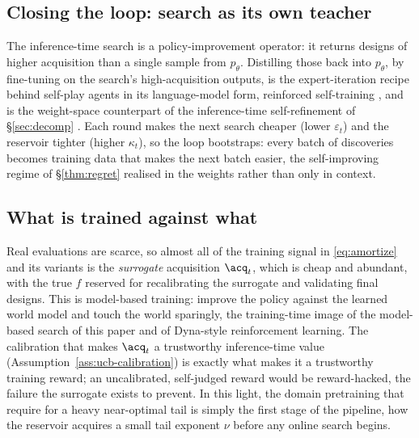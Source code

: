 \subsection{Closing the loop: search as its own teacher}
\label{sec:selfdistill}
The inference-time search is a policy-improvement operator: it returns designs of higher acquisition than a
single sample from $p_\theta$. Distilling those back into $p_\theta$, by fine-tuning on the search's
high-acquisition outputs, is the expert-iteration recipe behind self-play agents \citep{silver2017mastering} in
its language-model form, reinforced self-training \citep{gulcehre2023reinforced}, and is the weight-space
counterpart of the inference-time self-refinement of \S\ref{sec:decomp}
\citep{madaan2023selfrefine,shinn2023reflexion}. Each round makes the next search cheaper (lower
$\varepsilon_t$) and the reservoir tighter (higher $\kappa_t$), so the loop bootstraps: every batch of
discoveries becomes training data that makes the next batch easier, the self-improving regime of
\S\ref{thm:regret} realised in the weights rather than only in context.

\subsection{What is trained against what}
\label{sec:trainecon}
Real evaluations are scarce, so almost all of the training signal in \eqref{eq:amortize} and its variants is the
\emph{surrogate} acquisition $\acq_t$, which is cheap and abundant, with the true $f$ reserved for recalibrating
the surrogate and validating final designs. This is model-based training: improve the policy against the
learned world model and touch the world sparingly, the training-time image of the model-based search of this
paper and of Dyna-style reinforcement learning. The calibration that makes $\acq_t$ a trustworthy inference-time
value (Assumption~\ref{ass:ucb-calibration}) is exactly what makes it a trustworthy training reward; an uncalibrated,
self-judged reward would be reward-hacked, the failure the surrogate exists to prevent. In this light, the
domain pretraining that \citet{3692070.3693095} require for a heavy near-optimal tail is simply the first
stage of the pipeline, how the reservoir acquires a small tail exponent $\nu$ before any online search begins.
